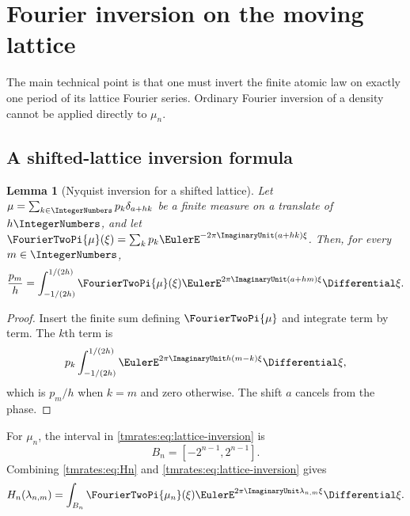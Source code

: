 \documentclass[11pt,oneside]{article}
\newtheorem{lemma}[lemma]{Lemma}
\theoremstyle{definition}
\theoremstyle{remark}
\begin{document}
\section{Fourier inversion on the moving lattice}
\label{tmrates:sec:fourier}

The main technical point is that one must invert the finite atomic law on exactly one period
of its lattice Fourier series.  Ordinary Fourier inversion of a density cannot be applied
directly to $\mu_n$.

\subsection{A shifted-lattice inversion formula}

\begin{lemma}[Nyquist inversion for a shifted lattice]
\label{tmrates:lem:lattice-inversion}
Let $\mu=\sum_{k\in\IntegerNumbers}p_k\delta_{a+hk}$ be a finite measure on a translate of $h\IntegerNumbers$, and let
$\FourierTwoPi{\mu}(\xi)=\sum_kp_k\EulerE^{-2\pi\ImaginaryUnit(a+hk)\xi}$.
Then, for every $m\in\IntegerNumbers$,
\begin{equation}
 \frac{p_m}{h}
 =\int_{-1/(2h)}^{1/(2h)}
   \FourierTwoPi{\mu}(\xi)\EulerE^{2\pi\ImaginaryUnit(a+hm)\xi}\Differential\xi.          \label{tmrates:eq:lattice-inversion}
\end{equation}
\end{lemma}

\begin{proof}
Insert the finite sum defining $\FourierTwoPi{\mu}$ and integrate term by term.  The
$k$th term is
\[
 p_k\int_{-1/(2h)}^{1/(2h)}\EulerE^{2\pi\ImaginaryUnit h(m-k)\xi}\Differential\xi,
\]
which is $p_m/h$ when $k=m$ and zero otherwise.  The shift $a$ cancels from the phase.
\end{proof}

For $\mu_n$, the interval in \eqref{tmrates:eq:lattice-inversion} is
\begin{equation}
 B_n=[-2^{n-1},2^{n-1}].                                   \label{tmrates:eq:Bn}
\end{equation}
Combining \eqref{tmrates:eq:Hn} and \eqref{tmrates:eq:lattice-inversion} gives
\begin{equation}
 H_n(\lambda_{n,m})
 =\int_{B_n}\FourierTwoPi{\mu_n}(\xi)
   \EulerE^{2\pi\ImaginaryUnit\lambda_{n,m}\xi}\Differential\xi.                  \label{tmrates:eq:Hn-inversion}
\end{equation}
\end{document}
